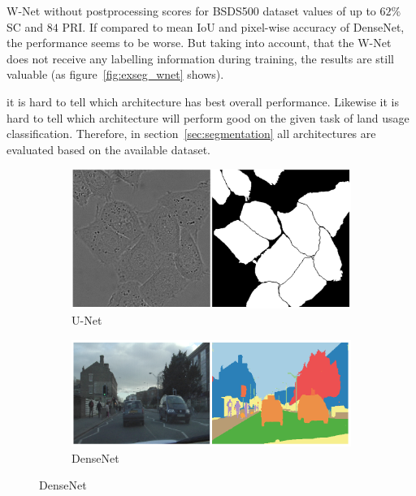 {W-Net without postprocessing scores for BSDS500 dataset values of up to $62\%$ SC and $84$ PRI. If compared to mean IoU and pixel-wise accuracy of DenseNet, the performance seems to be worse. But taking into account, that the W-Net does not receive any labelling information during training, the results are still valuable (as figure~\ref{fig:exseg_wnet} shows).

it is hard to tell which architecture has best overall performance. Likewise it is hard to tell which architecture will perform good on the given task of land usage classification. Therefore, in section~\ref{sec:segmentation} all architectures are evaluated based on the available dataset.
}

\begin{figure}
    \newcommand{\SegmentationExampleImageWidth}{0.3\textwidth}
    \centering
    \hfill
    \begin{subfigure}{\SegmentationExampleImageWidth}
        \includegraphics[width=\textwidth]{images/segmentation_example_unet}
        \caption{U-Net~\cite{unet15}}
        \label{fig:exseg_unet}
    \end{subfigure}
    \hfill
    \begin{subfigure}{0.4\textwidth}
        \includegraphics[width=\textwidth]{images/segmentation_example_densenet}
        \caption{DenseNet~\cite{denseseg17}}
        \label{fig:exseg_densenet}
    \end{subfigure}

\end{figure}
